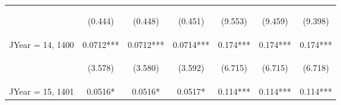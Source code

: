 \documentclass{standalone}
\begin{document}
\begin{tabular}{lcccccc}
    \vspace{4pt}     & \begin{footnotesize}(0.444)\end{footnotesize}   & \begin{footnotesize}(0.448)\end{footnotesize}   & \begin{footnotesize}(0.451)\end{footnotesize}   & \begin{footnotesize}(9.553)\end{footnotesize}  & \begin{footnotesize}(9.459)\end{footnotesize}  & \begin{footnotesize}(9.398)\end{footnotesize}  \\
    JYear = 14, 1400 & 0.0712***                                       & 0.0712***                                       & 0.0714***                                       & 0.174***                                       & 0.174***                                       & 0.174***                                       \\
    \vspace{4pt}     & \begin{footnotesize}(3.578)\end{footnotesize}   & \begin{footnotesize}(3.580)\end{footnotesize}   & \begin{footnotesize}(3.592)\end{footnotesize}   & \begin{footnotesize}(6.715)\end{footnotesize}  & \begin{footnotesize}(6.715)\end{footnotesize}  & \begin{footnotesize}(6.718)\end{footnotesize}  \\
    JYear = 15, 1401 & 0.0516*                                         & 0.0516*                                         & 0.0517*                                         & 0.114***                                       & 0.114***                                       & 0.114***                                       \\

\end{tabular}
\end{document}
